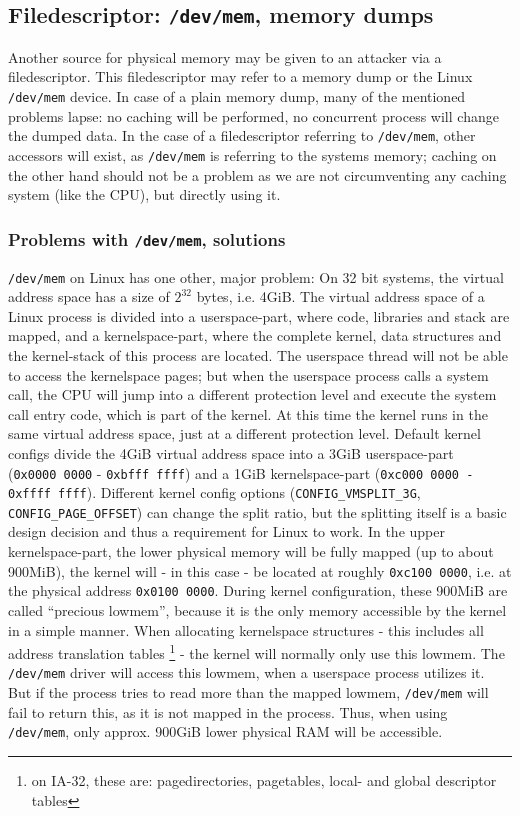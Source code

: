 \subsection{Filedescriptor: \texttt{/dev/mem}, memory dumps}

Another source for physical memory may be given to an attacker via a
filedescriptor. This filedescriptor may refer to a memory dump or the Linux
\texttt{/dev/mem} device. In case of a plain memory dump, many of the mentioned
problems lapse: no caching will be performed, no concurrent process will change
the dumped data. In the case of a filedescriptor referring to \texttt{/dev/mem},
other accessors will exist, as \texttt{/dev/mem} is referring to the systems
memory; caching on the other hand should not be a problem as we are not
circumventing any caching system (like the CPU), but directly using it.

\subsubsection{Problems with \texttt{/dev/mem}, solutions}

\texttt{/dev/mem} on Linux has one other, major problem:
\label{kerneluserdivision} On 32 bit systems, the virtual address space has a
size of $2^{32}$ bytes, i.e.  4GiB.  The virtual address space of a Linux
process is divided into a userspace-part, where code, libraries and stack are
mapped, and a kernelspace-part, where the complete kernel, data structures and
the kernel-stack of this process are located. The userspace thread will not be
able to access the kernelspace pages; but when the userspace process calls a
system call, the CPU will jump into a different protection level and execute the
system call entry code, which is part of the kernel. At this time the kernel
runs in the same virtual address space, just at a different protection level.
Default kernel configs divide the 4GiB virtual address space into a 3GiB
userspace-part (\texttt{0x0000~0000} - \texttt{0xbfff~ffff}) and a 1GiB
kernelspace-part (\texttt{0xc000~0000 - 0xffff~ffff}).  Different kernel config
options (\texttt{CONFIG\_VMSPLIT\_3G}, \texttt{CONFIG\_PAGE\_OFFSET}) can change
the split ratio, but the splitting itself is a basic design decision and thus a
requirement for Linux to work. In the upper kernelspace-part, the lower physical
memory will be fully mapped (up to about 900MiB), the kernel will - in this case
- be located at roughly \texttt{0xc100~0000}, i.e. at the physical address
\texttt{0x0100~0000}. During kernel configuration, these 900MiB are called
``precious lowmem'', because it is the only memory accessible by the kernel in a
simple manner. When allocating kernelspace structures - this includes all
address translation tables \footnote{on IA-32, these are: pagedirectories,
pagetables, local- and global descriptor tables} \label{linuxATTinlowmem} - the
kernel will normally only use this lowmem.  The \texttt{/dev/mem} driver will
access this lowmem, when a userspace process utilizes it. But if the process
tries to read more than the mapped lowmem, \texttt{/dev/mem} will fail to return
this, as it is not mapped in the process.  Thus, when using \texttt{/dev/mem},
only approx.  900GiB lower physical RAM will be accessible.

